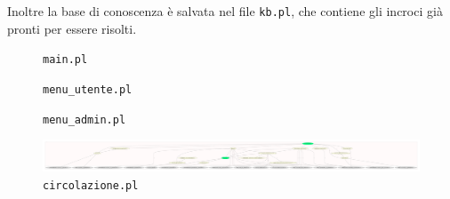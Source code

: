 Inoltre la base di conoscenza è salvata nel file \texttt{kb.pl}, che contiene gli incroci già pronti per essere risolti.

\begin{figure}
	\caption{\texttt{main.pl}}
\end{figure}

\begin{figure}
	\caption{\texttt{menu\_utente.pl}}
\end{figure}

\begin{figure}
	\caption{\texttt{menu\_admin.pl}}
\end{figure}
\restoregeometry


\begin{figure}
	\includegraphics[width=\textwidth, height=\textheight, keepaspectratio]{code/diagrams/circolazione}
	\caption{\texttt{circolazione.pl}}
\end{figure}

